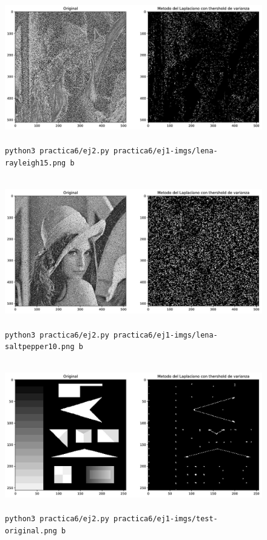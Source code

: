 \documentclass[11pt, spanish]{article}
\begin{document}
\begin{figure}[H]
\centering
    \includegraphics[height=6.5cm]{informe-imgs/ej2-b-lena-rayleigh15.jpg}
    \caption{\texttt{python3 practica6/ej2.py practica6/ej1-imgs/lena-rayleigh15.png b}}
\end{figure}

\begin{figure}[H]
\centering
    \includegraphics[height=6.5cm]{informe-imgs/ej2-b-lena-saltpepper10.jpg}
    \caption{\texttt{python3 practica6/ej2.py practica6/ej1-imgs/lena-saltpepper10.png b}}
\end{figure}


\begin{figure}[H]
\centering
    \includegraphics[height=6.5cm]{informe-imgs/ej2-b-test-original.jpg}
    \caption{\texttt{python3 practica6/ej2.py practica6/ej1-imgs/test-original.png b}}
\end{figure}
\end{document}
